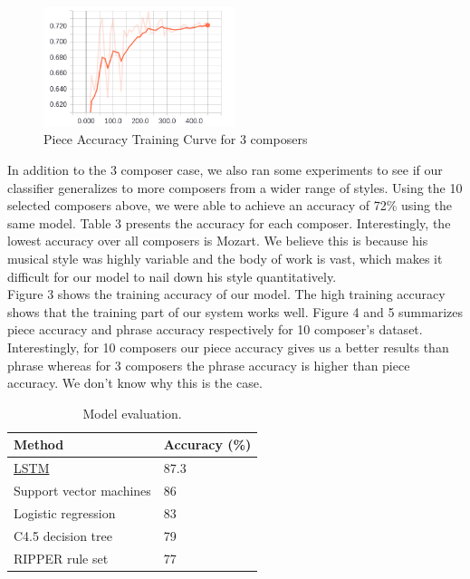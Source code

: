 \documentclass[11pt,a4paper]{article}
\begin{document}
\begin{figure}[h]
\caption{Piece Accuracy Training Curve for 3 composers}
\centering
\includegraphics[width=0.5\textwidth]{3_com_piece.png}
\end{figure}


In addition to the 3 composer case, we also ran some experiments to see if our classifier generalizes to more composers from a wider range of styles. Using the 10 selected composers above, we were able to achieve an accuracy of 72\% using the same model. Table 3 presents the accuracy for each composer. Interestingly, the lowest accuracy over all composers is Mozart. We believe this is because his musical style was highly variable and the body of work is vast, which makes it difficult for our model to nail down his style quantitatively. \\
Figure 3 shows the training accuracy of our model. The high training accuracy shows that the training part of our system works well. Figure 4 and 5 summarizes piece accuracy and phrase accuracy respectively for 10 composer's dataset. Interestingly, for 10 composers our piece accuracy gives us a better results than phrase whereas for 3 composers the phrase accuracy is higher than piece accuracy. We don't know why this is the case.



\begin{table}[t!]
\begin{center}
\begin{tabular}{|l|l|}
\hline \bf Method & \bf Accuracy (\%) \\ \hline
\underline{LSTM} & 87.3 \\
Support vector machines & 86 \\
Logistic regression & 83\\
C4.5 decision tree & 79\\
RIPPER rule set & 77\\
\hline
\end{tabular}
\end{center}
\caption{\label{resutls-table} Model evaluation. }
\end{table}
\end{document}

